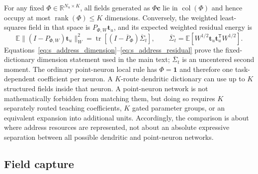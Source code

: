 For any fixed $\Phi\in\mathbb R^{N_u\times K}$, all fields generated as
$\Phi\bm c$ lie in $\operatorname{col}(\Phi)$ and hence occupy at most
$\operatorname{rank}(\Phi)\leq K$ dimensions. Conversely, the weighted
least-squares field in that space is $P_{\Phi,W}\bm t_u$, and its expected
weighted residual energy is
\begin{equation}
\mathbb E\lVert(I-P_{\Phi,W})\bm t_u\rVert_W^2
=\operatorname{tr}\!\left[(I-\overline P_\Phi)\overline\Sigma_t\right],
\qquad
\overline\Sigma_t=\mathbb E[W^{1/2}\bm t_u\bm t_u^{\mathsf T}W^{1/2}].
\label{eq:s_address_residual}
\end{equation}
Equations~\ref{eq:s_address_dimension}--\ref{eq:s_address_residual} prove the
fixed-dictionary dimension statement used in the main text;
$\overline\Sigma_t$ is an uncentered second moment. The ordinary point-neuron local
rule has $\Phi=\bm 1$ and therefore one task-dependent coefficient per neuron. A
$K$-route dendritic dictionary can use up to $K$ structured fields inside that
neuron. A point-neuron network is not mathematically forbidden from matching
them, but doing so requires $K$ separately routed teaching coefficients, $K$
gated parameter groups, or an equivalent expansion into additional units.
Accordingly, the comparison is about where address resources are represented,
not about an absolute expressive separation between all possible dendritic and
point-neuron networks.

\subsection{Field capture}


